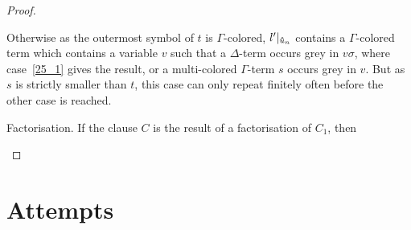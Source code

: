 \documentclass[,%
	paper=a4,%
	DIV11, %
	twoside=false,%
	liststotoc,
	bibtotoc,
	draft=false,%
	numbers=noendperiod
]{scrartcl}
\begin{document}
\begin{proof}
\begin{description}
\begin{enumerate}
					Otherwise as the outermost symbol of $t$ is $\Gamma$-colored, $l'|_{\bm\hat u_n}$ contains a $\Gamma$-colored term which contains a variable $v$ such that a $\Delta$-term occurs grey in $v\sigma$, where case~\ref{25_1} gives the result, or a multi-colored $\Gamma$-term $s$ occurs grey in $v$. But as $s$ is strictly smaller than $t$, this case can only repeat finitely often before the other case is reached.

			\end{enumerate}


		\item{}Factorisation.
			If the clause $C$ is the result of a factorisation of $C_1$, then
			\mytodo{}
			\qedhere
	\end{description}


\end{proof}







\clearpage

\section{Attempts}
\end{document}
